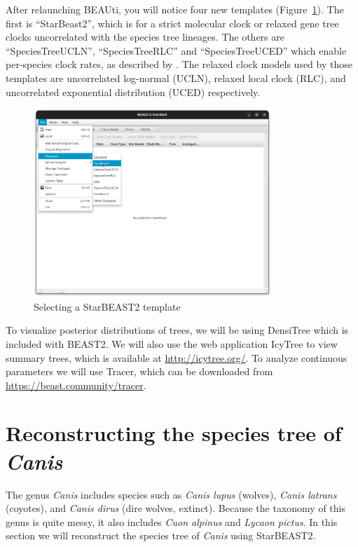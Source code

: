 \documentclass[12pt]{article}
\begin{document}
After relaunching BEAUti, you will notice four new templates (Figure~\ref{fig:strictClockTemplate}). The first
is ``StarBeast2'', which is for a strict molecular clock or relaxed
gene tree clocks uncorrelated with the species tree lineages. The others
are ``SpeciesTreeUCLN'', ``SpeciesTreeRLC'' and ``SpeciesTreeUCED'' which
enable per-species clock rates, as described by \cite{Ogilvie2016}.
The relaxed clock models used by those templates are uncorrelated log-normal (UCLN),
relaxed local clock (RLC), and uncorrelated exponential distribution (UCED)
respectively.

\begin{figure}[htb!]
\centering
\includegraphics[width=0.8\textwidth]{figures/strictClockTemplate.png}
\caption
{Selecting a StarBEAST2 template}
\label{fig:strictClockTemplate}
\end{figure}

To visualize posterior distributions of trees, we will be using DensiTree
\parencite{Bouckaert2010} which is included with BEAST2. We will also use the web application IcyTree to view summary trees, which is available at \url{http://icytree.org/}. To analyze continuous parameters we will use Tracer, which can be downloaded from \url{https://beast.community/tracer}.

\section{Reconstructing the species tree of \textit{Canis}}
\label{sec:speciesTree}

The genus \textit{Canis} includes species such as \textit{Canis lupus} (wolves),
\textit{Canis latrans} (coyotes), and \textit{Canis dirus} (dire wolves, extinct).
Because the
taxonomy of this genus is quite messy, it also includes
\textit{Cuon alpinus} and \textit{Lycaon pictus}.
In this section we will reconstruct the species tree of \textit{Canis} using StarBEAST2.
\end{document}
